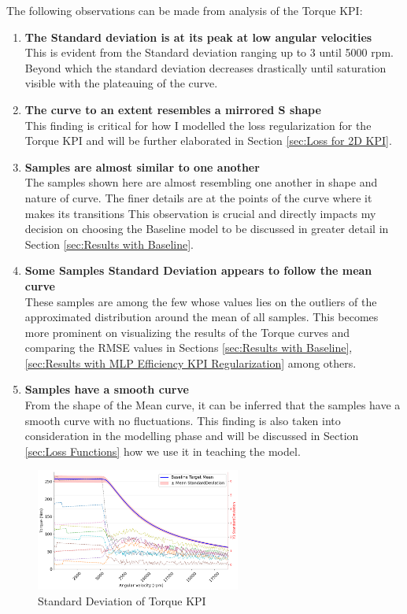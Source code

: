 \documentclass{report} %
\begin{document}
The following observations can be made from analysis of the Torque \ac{KPI}:
\begin{enumerate}[nosep]
    \item \textbf{The Standard deviation is at its peak at low angular velocities}\\
    This is evident from the Standard deviation ranging up to 3 until 5000 rpm. Beyond which the standard deviation decreases drastically until 
    saturation visible with the plateauing of the curve.
    \item \textbf{The curve to an extent resembles a mirrored S shape}\\           
    This finding is critical for how I modelled the loss regularization for the Torque \ac{KPI} and will be further elaborated in Section \ref{sec:Loss for 2D KPI}.
    \item \textbf{Samples are almost similar to one another}\\
    The samples shown here are almost resembling one another in shape and nature of curve. The finer details are at the points of the curve where it makes its transitions 
    This observation is crucial and directly impacts my decision on choosing the Baseline model to be discussed in greater detail in Section \ref{sec:Results with Baseline}.
    \item \textbf{Some Samples Standard Deviation appears to follow the mean curve}\\
    These samples are among the few whose values lies on the outliers of the approximated distribution around the mean of all samples. This becomes more 
    prominent on visualizing the results of the Torque curves and comparing the \ac{RMSE} values in Sections \ref{sec:Results with Baseline}, 
    \ref{sec:Results with MLP Efficiency KPI Regularization} among others.
    \item \textbf{Samples have a smooth curve}\\           
    From the shape of the Mean curve, it can be inferred that the samples have a smooth curve with no fluctuations. This finding is also taken into consideration in the 
    modelling phase and will be discussed in Section \ref{sec:Loss Functions} how we use it in teaching the model.
\end{enumerate}

\begin{figure}[H]
    \centering
    \includegraphics[width=0.6\textwidth]{./ReportImages/StandardDeviation_Baseline_y1.png} 
    \caption{Standard Deviation of Torque KPI} 
    \label{fig:Standard Deviation of 2D KPI}
\end{figure}
\end{document}
